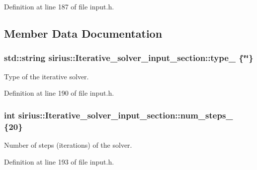 Definition at line 187 of file input.\+h.



\subsection{Member Data Documentation}
\hypertarget{structsirius_1_1_iterative__solver__input__section_afe633b0a2befbdceae1abd1354bf14cc}{}
\subsubsection[{type\+\_\+}]{\setlength{\rightskip}{0pt plus 5cm}std\+::string sirius\+::\+Iterative\+\_\+solver\+\_\+input\+\_\+section\+::type\+\_\+ \{\char`\"{}\char`\"{}\}}\label{structsirius_1_1_iterative__solver__input__section_afe633b0a2befbdceae1abd1354bf14cc}


Type of the iterative solver. 



Definition at line 190 of file input.\+h.

\hypertarget{structsirius_1_1_iterative__solver__input__section_a5c1bb6191eb63e0de00c89978fce53a1}{}
\subsubsection[{num\+\_\+steps\+\_\+}]{\setlength{\rightskip}{0pt plus 5cm}int sirius\+::\+Iterative\+\_\+solver\+\_\+input\+\_\+section\+::num\+\_\+steps\+\_\+ \{20\}}\label{structsirius_1_1_iterative__solver__input__section_a5c1bb6191eb63e0de00c89978fce53a1}


Number of steps (iterations) of the solver. 



Definition at line 193 of file input.\+h.

\hypertarget{structsirius_1_1_iterative__solver__input__section_ab0d3c4fac532bbf39de7d1df8158895e}{}
